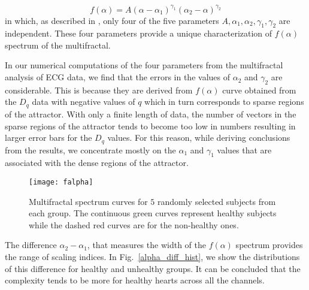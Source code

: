 \documentclass[9pt,twocolumn,twoside]{pnas-new}
\begin{document}
\begin{equation}
f(\alpha) = A(\alpha-\alpha_1)^{\gamma_1}(\alpha_2-\alpha)^{\gamma_2}
\end{equation}
in which, as described in \cite{harikrishnan2009computing}, only four of the five parameters $A, \alpha_1, \alpha_2, \gamma_1, \gamma_2$ are independent. These four parameters provide a unique characterization of $f(\alpha)$ spectrum of the multifractal.

In our numerical computations of the four parameters from the multifractal analysis of ECG data, we find that the errors in the values of $\alpha_{2}$ and $\gamma_2$ are considerable. This is because they are derived from $f(\alpha)$ curve obtained from the $D_q$ data with negative values of $q$ which in turn corresponds to sparse regions of the attractor. With only a finite length of data, the number of vectors in the sparse regions of the attractor tends to become too low in numbers resulting in larger error bars for the $D_q$ values. For this reason, while deriving conclusions from the results, we concentrate mostly on the $\alpha_1$ and $\gamma_1$ values that are associated with the dense regions of the attractor.


\begin{figure}[h]
\begin{center}
\texttt{[image: falpha]}
\caption{\label{falpha} Multifractal spectrum curves for $5$ randomly selected subjects from each group. The continuous green curves represent healthy subjects while the dashed red curves are for the non-healthy ones. }
\end{center}
\end{figure}

The difference $\alpha_2-\alpha_1$, that measures the width of the $f(\alpha)$ spectrum provides the range of scaling indices. In Fig.~\ref{alpha_diff_hist}, we show the distributions of this difference for healthy and unhealthy groups. It can be concluded that the complexity tends to be more for healthy hearts across all the channels.
\end{document}
